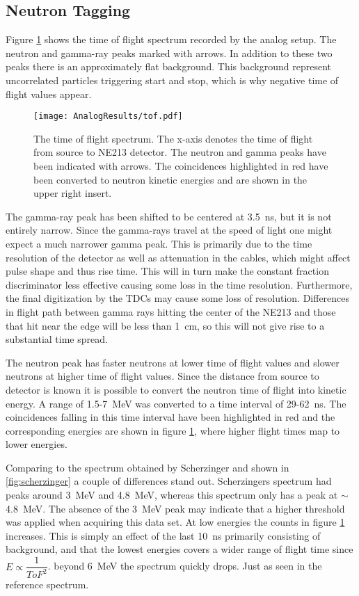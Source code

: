 \documentclass[main.tex]{subfiles}
\begin{document}
\subsection{Neutron Tagging}
Figure \ref{fig:tof_a} shows the time of flight spectrum recorded by the analog setup. The neutron and gamma-ray peaks marked with arrows. In addition to these two peaks there is an approximately flat background. This background represent uncorrelated particles triggering start and stop, which is why negative time of flight values appear.
\begin{figure}[ht]
    \centering
        \texttt{[image: AnalogResults/tof.pdf]}
        \caption[Time of flight spectrum, analog setup.]{The time of flight spectrum. The x-axis denotes the time of flight from source to NE213 detector. The neutron and gamma peaks have been indicated with arrows. The coincidences highlighted in red have been converted to neutron kinetic energies and are shown in the upper right insert.}
    \label{fig:tof_a}
\end{figure}

The gamma-ray peak has been shifted to be centered at \SI{3.5}{ns}, but it is not entirely narrow. Since the gamma-rays travel at the speed of light one might expect a much narrower gamma peak. This is primarily due to the time resolution of the detector as well as attenuation in the cables, which might affect pulse shape and thus rise time. This will in turn make the constant fraction discriminator less effective causing some loss in the time resolution. Furthermore, the final  digitization by the TDCs may cause some loss of resolution. Differences in flight path between gamma rays hitting the center of the NE213 and those that hit near the edge will be less than \SI{1}{cm}, so this will not give rise to a substantial time spread. 

The neutron peak has faster neutrons at lower time of flight values and slower neutrons at higher time of flight values. Since the distance from source to detector is known it is possible to convert the neutron time of flight into kinetic energy. A range of 1.5-\SI{7}{\MeV} was converted to a time interval of 29-\SI{62}{\ns}. The coincidences falling in this time interval have been highlighted in red and the corresponding energies are shown in figure \ref{fig:tof_a}, where higher flight times map to lower energies.

Comparing to the spectrum obtained by Scherzinger\cite{ScherzingerPhd} and shown in \ref{fig:scherzinger} a couple of differences stand out. Scherzingers spectrum had peaks around \SI{3}{\MeV} and \SI{4.8}{\MeV}, whereas this spectrum only has a peak at $\sim$\SI{4.8}{\MeV}. The absence of the \SI{3}{\MeV} peak may indicate that a higher threshold was applied when acquiring this data set. At low energies the counts in figure \ref{fig:tof_a} increases. This is simply an effect of the last \SI{10}{\ns} primarily consisting of background, and that the lowest energies covers a wider range of flight time since $E\propto \dfrac{1}{ToF^2}$. beyond \SI{6}{\MeV} the spectrum quickly drops. Just as seen in the reference spectrum.
\end{document}
